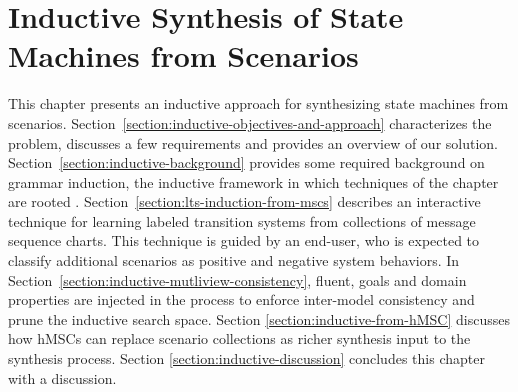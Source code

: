 \chapter{Inductive Synthesis of State Machines from Scenarios\label{chapter:inductive-synthesis}}

This chapter presents an inductive approach for synthesizing state machines from scenarios. Section~\ref{section:inductive-objectives-and-approach} characterizes the problem, discusses a few requirements and provides an overview of our solution. Section~\ref{section:inductive-background} provides some required background on grammar induction, the inductive framework in which techniques of the chapter are rooted \cite{Gold:1978}. Section~\ref{section:lts-induction-from-mscs} describes an interactive technique for learning labeled transition systems from collections of message sequence charts. This technique is guided by an end-user, who is expected to classify additional scenarios as positive and negative system behaviors. In Section~\ref{section:inductive-mutliview-consistency}, fluent, goals and domain properties are injected in the process to enforce inter-model consistency and prune the inductive search space. Section \ref{section:inductive-from-hMSC} discusses how hMSCs can replace scenario collections as richer synthesis input to the synthesis process. Section \ref{section:inductive-discussion} concludes this chapter with a discussion. 








